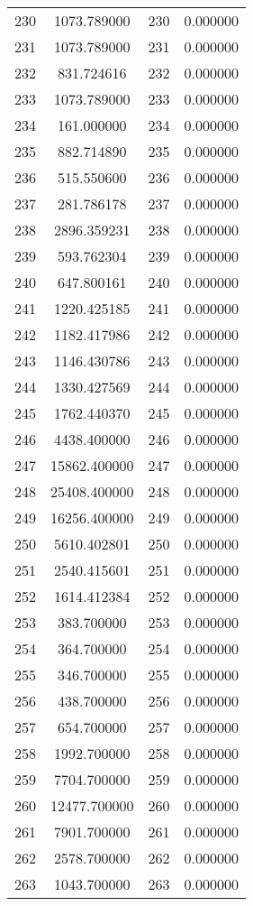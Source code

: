 \documentclass[12pt]{article}
\begin{document}
\begin{longtable}{@{}cccc@{}}
230 & 1073.789000 & 230 & 0.000000 \\
231 & 1073.789000 & 231 & 0.000000 \\
232 & 831.724616 & 232 & 0.000000 \\
233 & 1073.789000 & 233 & 0.000000 \\
234 & 161.000000 & 234 & 0.000000 \\
235 & 882.714890 & 235 & 0.000000 \\
236 & 515.550600 & 236 & 0.000000 \\
237 & 281.786178 & 237 & 0.000000 \\
238 & 2896.359231 & 238 & 0.000000 \\
239 & 593.762304 & 239 & 0.000000 \\
240 & 647.800161 & 240 & 0.000000 \\
241 & 1220.425185 & 241 & 0.000000 \\
242 & 1182.417986 & 242 & 0.000000 \\
243 & 1146.430786 & 243 & 0.000000 \\
244 & 1330.427569 & 244 & 0.000000 \\
245 & 1762.440370 & 245 & 0.000000 \\
246 & 4438.400000 & 246 & 0.000000 \\
247 & 15862.400000 & 247 & 0.000000 \\
248 & 25408.400000 & 248 & 0.000000 \\
249 & 16256.400000 & 249 & 0.000000 \\
250 & 5610.402801 & 250 & 0.000000 \\
251 & 2540.415601 & 251 & 0.000000 \\
252 & 1614.412384 & 252 & 0.000000 \\
253 & 383.700000 & 253 & 0.000000 \\
254 & 364.700000 & 254 & 0.000000 \\
255 & 346.700000 & 255 & 0.000000 \\
256 & 438.700000 & 256 & 0.000000 \\
257 & 654.700000 & 257 & 0.000000 \\
258 & 1992.700000 & 258 & 0.000000 \\
259 & 7704.700000 & 259 & 0.000000 \\
260 & 12477.700000 & 260 & 0.000000 \\
261 & 7901.700000 & 261 & 0.000000 \\
262 & 2578.700000 & 262 & 0.000000 \\
263 & 1043.700000 & 263 & 0.000000 \\

\end{longtable}
\end{document}
